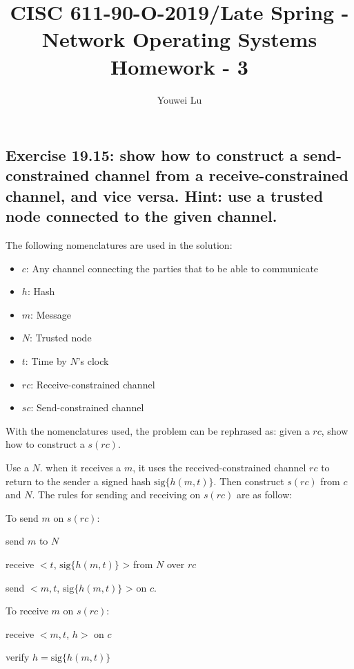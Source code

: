 \documentclass[doc,natbib,12pt]{article}
\title{CISC 611-90-O-2019/Late Spring - Network Operating Systems \\ Homework - 3}
\author{Youwei Lu}
\date{}
\begin{document}
	\maketitle
	
	
	\subsection*{Exercise 19.15: show how to construct a send-constrained channel from a receive-constrained channel, and vice versa. Hint: use a trusted node connected to the given channel.}
	
	The following nomenclatures are used in the solution:
	\begin{itemize}
		\item $c$: Any channel connecting the parties that to be able to communicate
		\item $h$: Hash
		\item $m$: Message
		\item $N$: Trusted node
		\item $t$: Time by $N$'s clock
		\item $rc$: Receive-constrained channel
		\item $sc$: Send-constrained channel
	\end{itemize}

	With the nomenclatures used, the problem can be rephrased as: given a $rc$, show how to construct a $s(rc)$.
	
	Use a $N$. when it receives a $m$, it uses the received-constrained channel $rc$ to return to the sender a signed hash $\text{sig}\{h(m,t)\}$. Then construct $s(rc)$ from $c$ and $N$. The rules for sending and receiving on $s(rc)$ are as follow:
	
	To send $m$ on $s(rc)$:
	
	\hspace{0.628in} send $m$ to $N$
	
	\hspace{0.628in} receive $< t$, $\text{sig}\{h(m,t)\}$ > from $N$ over $rc$
	
	\hspace{0.628in} send $< m, t$, $\text{sig}\{h(m,t)\}$ > on $c$.
	
	To receive $m$ on $s(rc)$:
	
	\hspace{0.628in} receive $< m, t$, $h > $ on $c$
	
	\hspace{0.628in} verify $h = \text{sig}\{h(m,t)\}$
	
\end{document}
